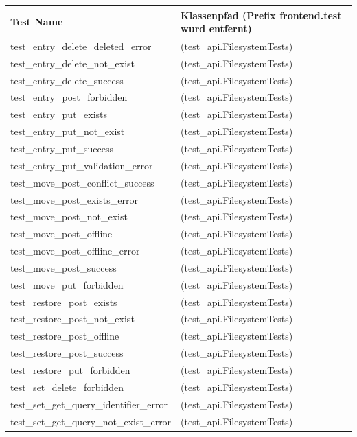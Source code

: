 \begin{longtable}{|p{10cm}|p{7cm}|}
\hline
Test Name & Klassenpfad (Prefix frontend.test wurd entfernt)\\\hline\hline
test\_entry\_delete\_deleted\_error & (test\_api.FilesystemTests)\\\hline
test\_entry\_delete\_not\_exist & (test\_api.FilesystemTests)\\\hline
test\_entry\_delete\_success & (test\_api.FilesystemTests)\\\hline
test\_entry\_post\_forbidden & (test\_api.FilesystemTests)\\\hline
test\_entry\_put\_exists & (test\_api.FilesystemTests)\\\hline
test\_entry\_put\_not\_exist & (test\_api.FilesystemTests)\\\hline
test\_entry\_put\_success & (test\_api.FilesystemTests)\\\hline
test\_entry\_put\_validation\_error & (test\_api.FilesystemTests)\\\hline
test\_move\_post\_conflict\_success & (test\_api.FilesystemTests)\\\hline
test\_move\_post\_exists\_error & (test\_api.FilesystemTests)\\\hline
test\_move\_post\_not\_exist & (test\_api.FilesystemTests)\\\hline
test\_move\_post\_offline & (test\_api.FilesystemTests)\\\hline
test\_move\_post\_offline\_error & (test\_api.FilesystemTests)\\\hline
test\_move\_post\_success & (test\_api.FilesystemTests)\\\hline
test\_move\_put\_forbidden & (test\_api.FilesystemTests)\\\hline
test\_restore\_post\_exists & (test\_api.FilesystemTests)\\\hline
test\_restore\_post\_not\_exist & (test\_api.FilesystemTests)\\\hline
test\_restore\_post\_offline & (test\_api.FilesystemTests)\\\hline
test\_restore\_post\_success & (test\_api.FilesystemTests)\\\hline
test\_restore\_put\_forbidden & (test\_api.FilesystemTests)\\\hline
test\_set\_delete\_forbidden & (test\_api.FilesystemTests)\\\hline
test\_set\_get\_query\_identifier\_error & (test\_api.FilesystemTests)\\\hline
test\_set\_get\_query\_not\_exist\_error & (test\_api.FilesystemTests)\\\hline

\end{longtable}
